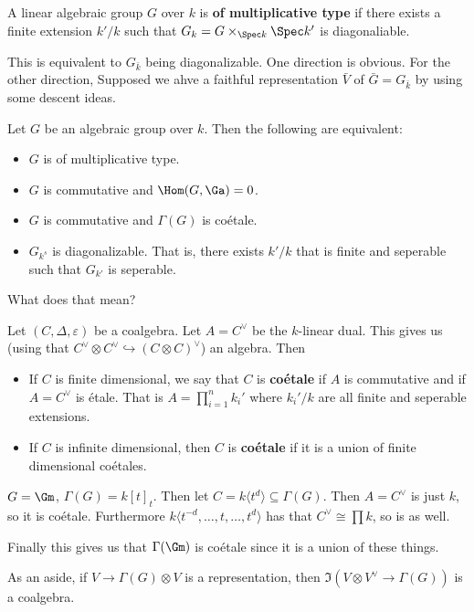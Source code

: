 \documentclass[12pt]{article}
\begin{document}
\begin{defn}
	A linear algebraic group $G$ over $k$ is \textbf{of multiplicative type} if there exists a finite extension $k'/k$ such that $G_{k}=G\times_{\Spec k}\Spec k'$ is diagonaliable.
\end{defn}
\begin{rmk}
	This is equivalent to $G_{\bar k}$ being diagonalizable. One direction is obvious. For the other direction, Supposed we ahve a faithful 
	representation $\bar V$ of $\bar G=G_{\bar k}$ by using some descent ideas.
\end{rmk}

\begin{thm}
	Let $G$ be an algebraic group over $k$. Then the following are equivalent:
	\begin{itemize}
		\item $G$ is of multiplicative type.
		\item $G$ is commutative and $\Hom(G,\Ga)=0$.
		\item $G$ is commutative and $\Gamma(G)$ is co\'etale.
		\item $G_{k^s}$ is diagonalizable. That is, there exists $k'/k$ that is finite and seperable such that $G_{k'}$ is seperable.
	\end{itemize}
\end{thm}
What does that mean?
\begin{defn}
	Let $(C,\Delta,\varepsilon)$ be a coalgebra. Let $A=C^\vee$ be the $k$-linear dual. This gives us (using that $C^\vee\otimes C^\vee\hookrightarrow (C\otimes C)^\vee$)
	an algebra. Then 
	\begin{itemize}
		\item If $C$ is finite dimensional, we say that $C$ is \textbf{co\'etale} if $A$ is commutative and if $A=C^\vee$ is \'etale. That is 
		$A=\prod_{i=1}^n k_i'$ where $k_i'/k$ are all finite and seperable extensions.
		\item If $C$ is infinite dimensional, then $C$ is \textbf{co\'etale} if it is a union of finite dimensional co\'etales.
	\end{itemize}
\end{defn}
\begin{ex}
	$G=\Gm$, $\Gamma(G)=k[t]_t$. Then let $C=k\langle t^d\rangle\subseteq \Gamma(G)$. Then $A=C^\vee$ is just $k$, so it is co\'etale.
	Furthermore $k\langle t^{-d},\dots,t,\dots,t^d\rangle$ has that $C^\vee\cong \prod k$, so is as well.

	Finally this gives us that $\Gamma(\Gm)$ is co\'etale since it is a union of these things.
\end{ex}
As an aside, if $V\to \Gamma(G)\otimes V$ is a representation, then $\Im(V\otimes V^\vee\to \Gamma(G))$ is a coalgebra.
\end{document}
